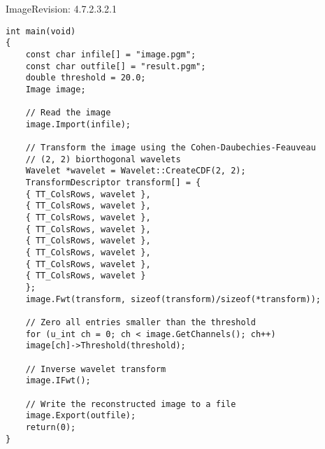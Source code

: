 \begin{manpage}{\libtitle}{Image}{$ $Revision: 4.7.2.3.2.1 $ $}
\begin{verbatim}
int main(void)
{
    const char infile[] = "image.pgm";
    const char outfile[] = "result.pgm";
    double threshold = 20.0;
    Image image;

    // Read the image
    image.Import(infile);

    // Transform the image using the Cohen-Daubechies-Feauveau
    // (2, 2) biorthogonal wavelets
    Wavelet *wavelet = Wavelet::CreateCDF(2, 2);
    TransformDescriptor transform[] = {
	{ TT_ColsRows, wavelet },
	{ TT_ColsRows, wavelet },
	{ TT_ColsRows, wavelet },
	{ TT_ColsRows, wavelet },
	{ TT_ColsRows, wavelet },
	{ TT_ColsRows, wavelet },
	{ TT_ColsRows, wavelet },
	{ TT_ColsRows, wavelet }
    };
    image.Fwt(transform, sizeof(transform)/sizeof(*transform));

    // Zero all entries smaller than the threshold
    for (u_int ch = 0; ch < image.GetChannels(); ch++)
	image[ch]->Threshold(threshold);

    // Inverse wavelet transform
    image.IFwt();

    // Write the reconstructed image to a file
    image.Export(outfile);
    return(0);
}
\end{verbatim}


\subtitle{Revision}

\end{manpage}

